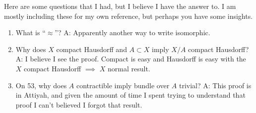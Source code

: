 \documentclass[12]{amsart}
\begin{document}
Here are some questions that I had, but I believe I have the answer to. I am mostly including these for my own reference, but perhaps you have some insights.

\begin{enumerate}
    \item What is ``$\approx$''? A: Apparently another way to write isomorphic.\\

    \item Why does $X$ compact Hausdorff and $A \subset X$ imply $X/A$ compact Hausdorff? A: I believe I see the proof. Compact is easy and Hausdorff is easy with the $X$ compact Hausdorff $\implies$ $X$ normal result.\\

    \item On 53, why does $A$ contractible imply bundle over $A$ trivial? A: This proof is in Attiyah, and given the amount of time I spent trying to understand that proof I can't believed I forgot that result.


\end{enumerate}
\end{document}
